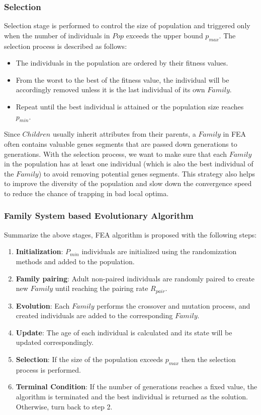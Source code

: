 \documentclass[final]{elsarticle}
\begin{document}
\subsubsection{Selection}

Selection stage is performed to control the size of population and triggered only when the number of individuals in $Pop$ exceeds the upper bound $p_{max}$. The selection process is described as follows: 
\begin{itemize}
	\item The individuals in the population are ordered by their fitness values. 
	\item From the worst to the best of the fitness value, the individual will be accordingly removed unless it is the last individual of its own $ Family $. 
	\item Repeat until the best individual is attained or the population size reaches $p_{min}$.
\end{itemize}
Since $Children$ usually inherit attributes from their parents, a $Family$ in FEA often contains valuable genes segments that are passed down generations to generations. With the selection process, we want to make sure that each $ Family $ in the population has at least one individual (which is also the best individual of the $ Family $) to avoid removing potential genes segments. This strategy also helps to improve the diversity of the population and slow down the convergence speed to reduce the chance of trapping in bad local optima.

\subsubsection{Family System based Evolutionary Algorithm}

Summarize the above stages, FEA algorithm is proposed with the following steps:

\begin{enumerate}
	\item \textbf{Initialization}: $P_{min}$ individuals are initialized using the randomization methods and added to the population.
	\item \textbf{Family pairing}: Adult non-paired individuals are randomly paired to create new $ Family $ until reaching the pairing rate $R_{pair}$.
	\item \textbf{Evolution}: Each $ Family $ performs the crossover and mutation process, and created individuals are added to the corresponding $ Family $.
	\item \textbf{Update}: The age of each individual is calculated and its state will be updated correspondingly.
	\item \textbf{Selection}: If the size of the population exceeds $p_{max}$ then the selection process is performed.
	\item \textbf{Terminal Condition}: If the number of generations reaches a fixed value, the algorithm is terminated and the best individual is returned as the solution. Otherwise, turn back to step 2.
\end{enumerate}
\end{document}
